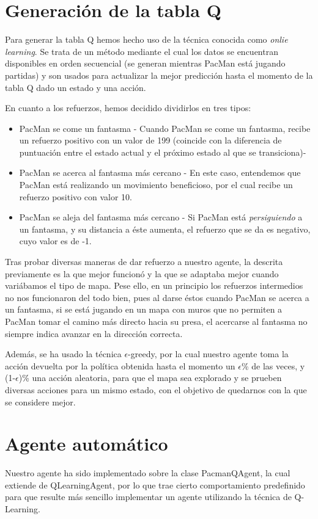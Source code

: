\documentclass[12pt]{article}
\begin{document}
\section{Generación de la tabla Q}
Para generar la tabla Q hemos hecho uso de la técnica conocida como \textit{onlie learning}. Se trata de un método mediante el cual los datos se encuentran disponibles en orden secuencial (se generan mientras PacMan está jugando partidas) y son usados para actualizar la mejor predicción hasta el momento de la tabla Q dado un estado y una acción.

En cuanto a los refuerzos, hemos decidido dividirlos en tres tipos:
\begin{itemize}
	\item PacMan se come un fantasma - Cuando PacMan se come un fantasma, recibe un refuerzo positivo con un valor de 199 (coincide con la diferencia de puntuación entre el estado actual y el próximo estado al que se transiciona)-
	\item PacMan se acerca al fantasma más cercano - En este caso, entendemos que PacMan está realizando un movimiento beneficioso, por el cual recibe un refuerzo positivo con valor 10.
	\item PacMan se aleja del fantasma más cercano - Si PacMan está \textit{persiguiendo} a un fantasma, y su distancia a éste aumenta, el refuerzo que se da es negativo, cuyo valor es de -1.
\end{itemize}

Tras probar diversas maneras de dar refuerzo a nuestro agente, la descrita previamente es la que mejor funcionó y la que se adaptaba mejor cuando variábamos el tipo de mapa. Pese ello, en un principio los refuerzos intermedios no nos funcionaron del todo bien, pues al darse éstos cuando PacMan se acerca a un fantasma, si se está jugando en un mapa con muros que no permiten a PacMan tomar el camino más directo hacia su presa, el acercarse al fantasma no siempre indica avanzar en la dirección correcta.

Además, se ha usado la técnica $\epsilon$-greedy, por la cual nuestro agente toma la acción devuelta por la política obtenida hasta el momento un $\epsilon$\% de las veces, y (1-$\epsilon$)\% una acción aleatoria, para que el mapa sea explorado y se prueben diversas acciones para un mismo estado, con el objetivo de quedarnos con la que se considere mejor.

\section{Agente automático}
Nuestro agente ha sido implementado sobre la clase PacmanQAgent, la cual extiende de QLearningAgent, por lo que trae cierto comportamiento predefinido para que resulte más sencillo implementar un agente utilizando la técnica de Q-Learning.
\end{document}
